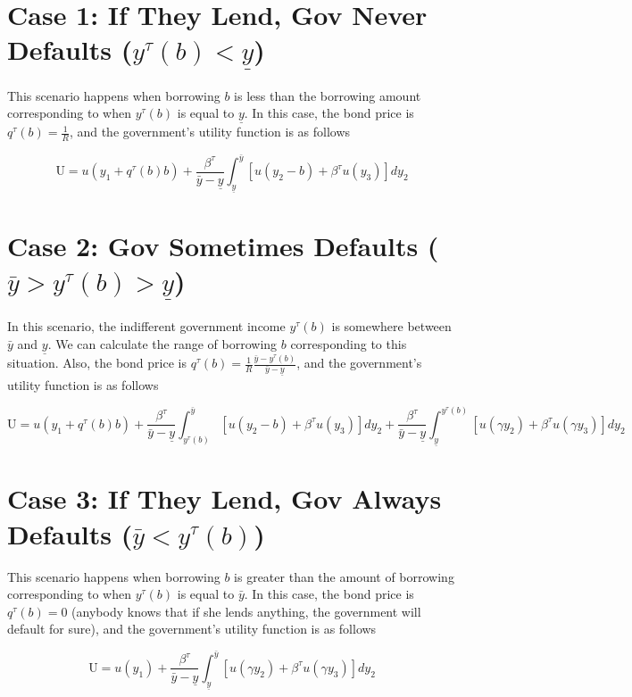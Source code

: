 \documentclass{article}
\begin{document}
\section{Case 1: If They Lend, Gov Never Defaults ($y^\tau(b) < \underline{y}$)}

This scenario happens when borrowing $b$ is less than the borrowing amount corresponding to when $y^\tau(b)$ is equal to $\underline{y}$. In this case, the bond price is $ q^\tau(b) =\frac{1}{R}$, and the government's utility function is as follows

$$
\text{U} = u(y_1 + q^\tau(b)b) + \frac{\beta^\tau}{\bar{y} - \underline{y}} \int_{\underline{y}}^{\bar{y}} \left[ u(y_2 - b) + \beta^\tau u(y_3) \right] dy_2
$$
 


\section{Case 2: Gov Sometimes Defaults ($\bar{y} > y^\tau(b) > \underline{y}$)}

In this scenario, the indifferent government income $y^\tau(b)$ is somewhere between $\bar{y}$ and $\underline{y}$. We can calculate the range of borrowing $b$ corresponding to this situation. Also, the bond price is $ q^\tau(b) =\frac{1}{R} \frac{\bar{y} - y^\tau(b)}{\bar{y} - \underline{y}}$, and the government's utility function is as follows

$$
\text{U} = u(y_1 + q^\tau(b)b) + \frac{\beta^\tau}{\bar{y} - \underline{y}} \int_{y^\tau(b)}^{\bar{y}} \left[ u(y_2 - b) + \beta^\tau u(y_3) \right] dy_2 + \frac{\beta^\tau}{\bar{y} - \underline{y}} \int_{\underline{y}}^{y^\tau(b)} \left[ u(\gamma y_2) + \beta^\tau u(\gamma y_3) \right] dy_2
$$

\section{Case 3: If They Lend, Gov Always Defaults ($\bar{y} < y^\tau(b)$)}

This scenario happens when borrowing $b$ is greater than the amount of borrowing corresponding to when $y^\tau(b)$ is equal to $\bar{y}$. In this case, the bond price is $ q^\tau(b) =0$ (anybody knows that if she lends anything, the government will default for sure), and the government's utility function is as follows

$$
\text{U} = u(y_1) + \frac{\beta^\tau}{\bar{y} - \underline{y}} \int_{\underline{y}}^{\bar{y}} \left[ u(\gamma y_2) + \beta^\tau u(\gamma y_3) \right] dy_2
$$
\end{document}
